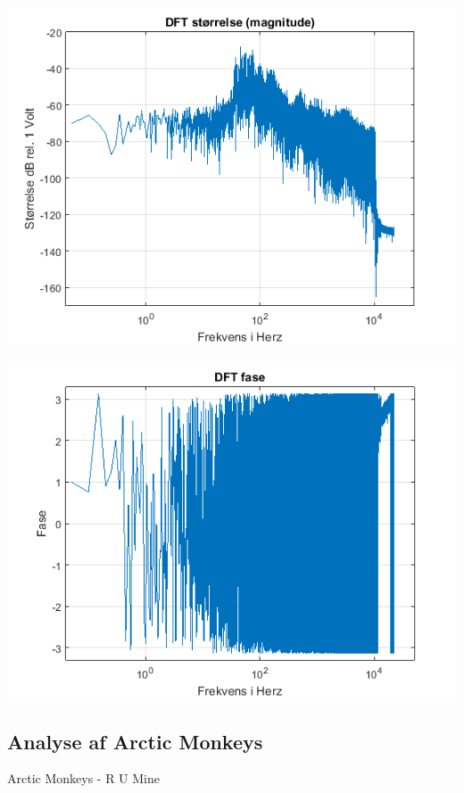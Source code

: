 \documentclass[12pt, letterpaper]{article}
\begin{document}
\begin{center}
\includegraphics[width=\textwidth]{billeder/eminemstorrelse}
\end{center}

\begin{center}
\includegraphics[width=\textwidth]{billeder/eminemfase}
\end{center}

\subsection{Analyse af Arctic Monkeys}
Arctic Monkeys - R U Mine
\end{document}
